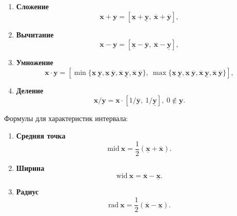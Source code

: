 \documentclass{article}
\begin{document}
  \begin{enumerate}
  \item \textbf{Сложение}
    \begin{equation}
      \mathbf{x} + \mathbf{y} = \left [ \underline{\mathbf{x}} + \underline{\mathbf{y}}, \ \overline{\mathbf{x}} + \overline{\mathbf{y}} \right ],
    \end{equation}
  \item \textbf{Вычитание}
    \begin{equation}
      \mathbf{x} - \mathbf{y} = \left [ \underline{\mathbf{x}} - \overline{\mathbf{y}}, \ \overline{\mathbf{x}} - \underline{\mathbf{y}} \right ],
    \end{equation}
  \item \textbf{Умножение}
    \begin{equation}
      \mathbf{x} \cdot \mathbf{y} = \left [
        \min \{
          \underline{\mathbf{x}} \ \underline{\mathbf{y}},
          \underline{\mathbf{x}} \ \overline{\mathbf{y}},
          \overline{\mathbf{x}} \ \underline{\mathbf{y}},
          \overline{\mathbf{x}} \ \overline{\mathbf{y}}
        \}, \
        \max \{
          \underline{\mathbf{x}} \ \underline{\mathbf{y}},
          \underline{\mathbf{x}} \ \overline{\mathbf{y}},
          \overline{\mathbf{x}} \ \underline{\mathbf{y}},
          \overline{\mathbf{x}} \ \overline{\mathbf{y}}
        \}
      \right ],
    \end{equation}
  \item \textbf{Деление}
    \begin{equation}
      \mathbf{x} / \mathbf{y} = \mathbf{x} \cdot \left [ 1 / \overline{\mathbf{y}}, \ 1 / \underline{\mathbf{y}} \right ], \ 0 \notin \mathbf{y}.
    \end{equation}
  \end{enumerate}

  \clearpage

  Формулы для характеристик интервала:

  \begin{enumerate}
  \item \textbf{Средняя точка}
    \begin{equation}
      \text{mid} \ \mathbf{x} = \frac{1}{2} (\underline{\mathbf{x}} + \overline{\mathbf{x}}).
    \end{equation}
  \item \textbf{Ширина}
    \begin{equation}
      \text{wid} \ \mathbf{x} = \overline{\mathbf{x}} - \underline{\mathbf{x}}.
    \end{equation}
  \item \textbf{Радиус}
    \begin{equation}
      \text{rad} \ \mathbf{x} = \frac{1}{2} (\overline{\mathbf{x}} - \underline{\mathbf{x}}).
    \end{equation}
  \end{enumerate}
\end{document}
